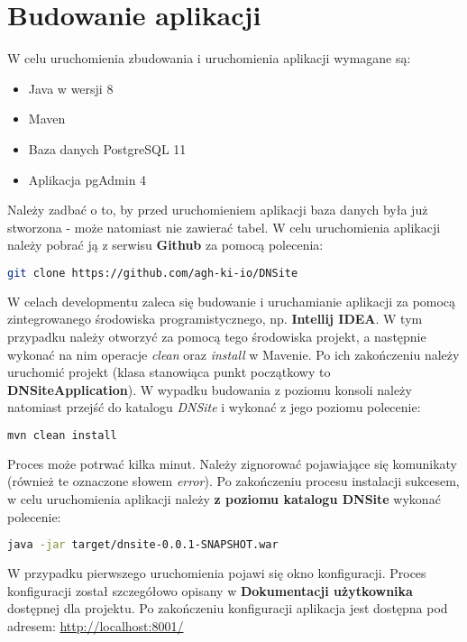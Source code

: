 \documentclass[11pt]{article}
\begin{document}
\section{Budowanie aplikacji}
W celu uruchomienia zbudowania i uruchomienia aplikacji wymagane są:
\begin{itemize}
\item Java w wersji 8
\item Maven
\item Baza danych PostgreSQL 11
\item Aplikacja pgAdmin 4
\end{itemize}
Należy zadbać o to, by przed uruchomieniem aplikacji baza danych była już stworzona - może natomiast nie zawierać tabel.
W celu uruchomienia aplikacji należy pobrać ją z serwisu \textbf{Github} za pomocą polecenia:
\begin{lstlisting}[language=bash]
git clone https://github.com/agh-ki-io/DNSite
\end{lstlisting}
W celach developmentu zaleca się budowanie i uruchamianie aplikacji za pomocą zintegrowanego środowiska programistycznego, np. \textbf{Intellij IDEA}. W tym przypadku należy otworzyć za pomocą tego środowiska projekt, a następnie wykonać na nim operacje \emph{clean} oraz \emph{install} w Mavenie. Po ich zakończeniu należy uruchomić projekt (klasa stanowiąca punkt początkowy to \textbf{DNSiteApplication}). \newline
W wypadku budowania z poziomu konsoli należy natomiast przejść do katalogu \emph{DNSite} i wykonać z jego poziomu polecenie:
\begin{lstlisting}[language=bash]
mvn clean install
\end{lstlisting}
Proces może potrwać kilka minut. Należy zignorować pojawiające się komunikaty (również te oznaczone słowem \emph{error}). Po zakończeniu procesu instalacji sukcesem, w celu uruchomienia aplikacji należy \textbf{z poziomu katalogu DNSite} wykonać polecenie:
\begin{lstlisting}[language=bash]
java -jar target/dnsite-0.0.1-SNAPSHOT.war
\end{lstlisting}
W przypadku pierwszego uruchomienia pojawi się okno konfiguracji. Proces konfiguracji został szczegółowo opisany w \textbf{Dokumentacji użytkownika} dostępnej dla projektu. Po zakończeniu konfiguracji aplikacja jest dostępna pod adresem: \url{http://localhost:8001/}
\end{document}
